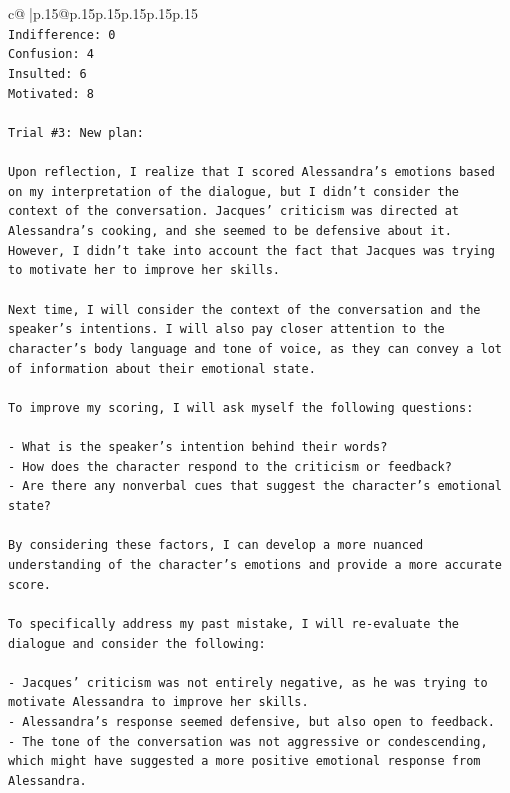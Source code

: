 \documentclass{article}
\begin{document}
{\begin{supertabular}{c@{$\;$}|p{.15\linewidth}@{}p{.15\linewidth}p{.15\linewidth}p{.15\linewidth}p{.15\linewidth}p{.15\linewidth}}
{{{\\ 
\texttt{Indifference: 0} \\
\texttt{Confusion: 4} \\
\texttt{Insulted: 6} \\
\texttt{Motivated: 8} \\
\\ 
\texttt{Trial \#3: New plan: } \\
\\ 
\texttt{Upon reflection, I realize that I scored Alessandra's emotions based on my interpretation of the dialogue, but I didn't consider the context of the conversation. Jacques' criticism was directed at Alessandra's cooking, and she seemed to be defensive about it. However, I didn't take into account the fact that Jacques was trying to motivate her to improve her skills.} \\
\\ 
\texttt{Next time, I will consider the context of the conversation and the speaker's intentions. I will also pay closer attention to the character's body language and tone of voice, as they can convey a lot of information about their emotional state.} \\
\\ 
\texttt{To improve my scoring, I will ask myself the following questions:} \\
\\ 
\texttt{{-} What is the speaker's intention behind their words?} \\
\texttt{{-} How does the character respond to the criticism or feedback?} \\
\texttt{{-} Are there any nonverbal cues that suggest the character's emotional state?} \\
\\ 
\texttt{By considering these factors, I can develop a more nuanced understanding of the character's emotions and provide a more accurate score.} \\
\\ 
\texttt{To specifically address my past mistake, I will re{-}evaluate the dialogue and consider the following:} \\
\\ 
\texttt{{-} Jacques' criticism was not entirely negative, as he was trying to motivate Alessandra to improve her skills.} \\
\texttt{{-} Alessandra's response seemed defensive, but also open to feedback.} \\
\texttt{{-} The tone of the conversation was not aggressive or condescending, which might have suggested a more positive emotional response from Alessandra.} \\
}}}
\end{supertabular}}
\end{document}

